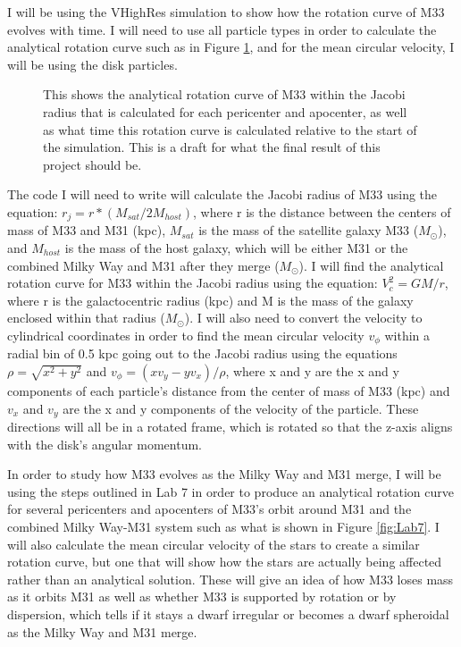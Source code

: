 \documentclass[trackchanges, twocolumn]{aastex7}
\begin{document}
I will be using the VHighRes simulation to show how the rotation curve of M33 evolves with time. I will need to use all particle types in order to calculate the analytical rotation curve such as in Figure \ref{fig:M33Evo}, and for the mean circular velocity, I will be using the disk particles.

\begin{figure}[ht!]
\caption{ This shows the analytical rotation curve of M33 within the Jacobi radius that is calculated for each pericenter and apocenter, as well as what time this rotation curve is calculated relative to the start of the simulation. This is a draft for what the final result of this project should be.
\label{fig:M33Evo}}
\end{figure}

The code I will need to write will calculate the Jacobi radius of M33 using the equation: 
\(r_j = r*(M_{sat}/2M_{host})\),
where r is the distance between the centers of mass of M33 and M31 (kpc), \(M_{sat}\) is the mass of the satellite galaxy M33 (\(M_\odot\)), and \(M_{host}\) is the mass of the host galaxy, which will be either M31 or the combined Milky Way and M31 after they merge (\(M_\odot\)). I will find the analytical rotation curve for M33 within the Jacobi radius using the equation:
\(V_c^2=GM/r\),
where r is the galactocentric radius (kpc) and M is the mass of the galaxy enclosed within that radius (\(M_\odot\)). I will also need to convert the velocity to cylindrical coordinates in order to find the mean circular velocity \(v_\phi\) within a radial bin of 0.5 kpc going out to the Jacobi radius using the equations \(\rho=\sqrt{x^2+y^2}\) and \(v_\phi=(xv_y-yv_x)/\rho\), where x and y are the x and y components of each particle's distance from the center of mass of M33 (kpc) and \(v_x\) and \(v_y\) are the x and y components of the velocity of the particle. These directions will all be in a rotated frame, which is rotated so that the z-axis aligns with the disk's angular momentum.

In order to study how M33 evolves as the Milky Way and M31 merge, I will be using the steps outlined in Lab 7 in order to produce an analytical rotation curve for several pericenters and apocenters of M33's orbit around M31 and the combined Milky Way-M31 system such as what is shown in Figure \ref{fig:Lab7}. I will also calculate the mean circular velocity of the stars to create a similar rotation curve, but one that will show how the stars are actually being affected rather than an analytical solution. These will give an idea of how M33 loses mass as it orbits M31 as well as whether M33 is supported by rotation or by dispersion, which tells if it stays a dwarf irregular or becomes a dwarf spheroidal as the Milky Way and M31 merge.
\end{document}
